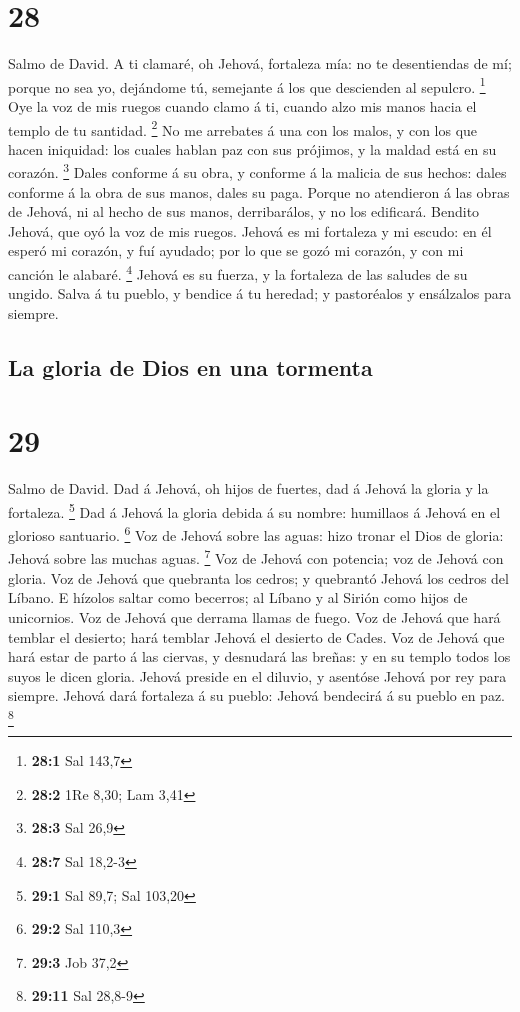 \hypertarget{section-27}{%
\section{28}\label{section-27}}

 Salmo de David. A ti clamaré, oh Jehová, fortaleza mía: no
te desentiendas de mí; porque no sea yo, dejándome tú, semejante á los
que descienden al sepulcro. \footnote{\textbf{28:1} Sal 143,7}
 Oye la voz de mis ruegos cuando clamo á ti, cuando alzo mis
manos hacia el templo de tu santidad. \footnote{\textbf{28:2} 1Re 8,30;
  Lam 3,41}  No me arrebates á una con los malos, y con los
que hacen iniquidad: los cuales hablan paz con sus prójimos, y la maldad
está en su corazón. \footnote{\textbf{28:3} Sal 26,9}  Dales
conforme á su obra, y conforme á la malicia de sus hechos: dales
conforme á la obra de sus manos, dales su paga.  Porque no
atendieron á las obras de Jehová, ni al hecho de sus manos,
derribarálos, y no los edificará.  Bendito Jehová, que oyó
la voz de mis ruegos.  Jehová es mi fortaleza y mi escudo:
en él esperó mi corazón, y fuí ayudado; por lo que se gozó mi corazón, y
con mi canción le alabaré. \footnote{\textbf{28:7} Sal 18,2-3}
 Jehová es su fuerza, y la fortaleza de las saludes de su
ungido.  Salva á tu pueblo, y bendice á tu heredad; y
pastoréalos y ensálzalos para siempre.

\hypertarget{la-gloria-de-dios-en-una-tormenta}{%
\subsection{La gloria de Dios en una
tormenta}\label{la-gloria-de-dios-en-una-tormenta}}

\hypertarget{section-28}{%
\section{29}\label{section-28}}

 Salmo de David. Dad á Jehová, oh hijos de fuertes, dad á
Jehová la gloria y la fortaleza. \footnote{\textbf{29:1} Sal 89,7; Sal
  103,20}  Dad á Jehová la gloria debida á su nombre:
humillaos á Jehová en el glorioso santuario. \footnote{\textbf{29:2} Sal
  110,3}  Voz de Jehová sobre las aguas: hizo tronar el Dios
de gloria: Jehová sobre las muchas aguas. \footnote{\textbf{29:3} Job
  37,2}  Voz de Jehová con potencia; voz de Jehová con
gloria.  Voz de Jehová que quebranta los cedros; y quebrantó
Jehová los cedros del Líbano.  E hízolos saltar como
becerros; al Líbano y al Sirión como hijos de unicornios. 
Voz de Jehová que derrama llamas de fuego.  Voz de Jehová
que hará temblar el desierto; hará temblar Jehová el desierto de Cades.
 Voz de Jehová que hará estar de parto á las ciervas, y
desnudará las breñas: y en su templo todos los suyos le dicen gloria.
 Jehová preside en el diluvio, y asentóse Jehová por rey
para siempre.  Jehová dará fortaleza á su pueblo: Jehová
bendecirá á su pueblo en paz. \footnote{\textbf{29:11} Sal 28,8-9}


